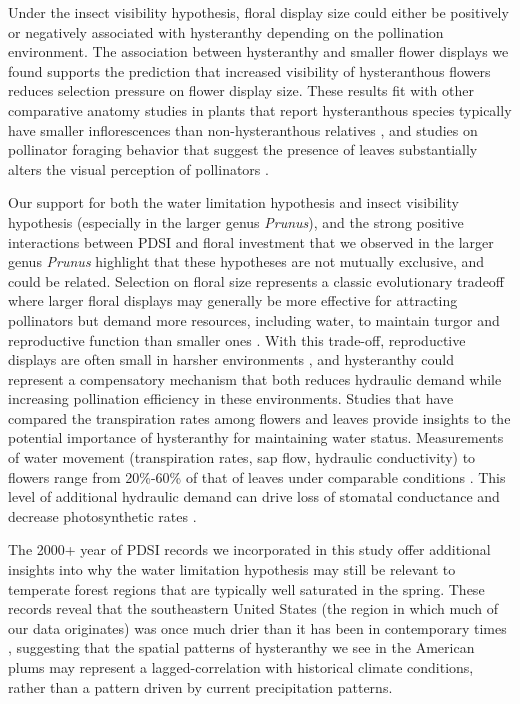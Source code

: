 \documentclass{article}[12pt]
\begin{document}
{{Under the insect visibility hypothesis, floral display size could either be positively or negatively associated with hysteranthy depending on the pollination environment. The association between hysteranthy and smaller flower displays we found supports the prediction that increased visibility of hysteranthous flowers reduces selection pressure on flower display size. These results fit with other comparative anatomy studies in plants that report hysteranthous species typically have smaller inflorescences than non-hysteranthous relatives \citep{Gunatilleke1984}, and studies on pollinator foraging behavior that suggest the presence of leaves substantially alters the visual perception of pollinators \citep{Rivest:2017aa,Forrest:2009aa}.%

Our support for both the water limitation hypothesis and insect visibility hypothesis (especially in the larger genus \emph{Prunus}), and the strong positive interactions between PDSI and floral investment that we observed in the larger genus \emph{Prunus} highlight that these hypotheses are not mutually exclusive, and could be related. Selection on floral size represents a classic evolutionary tradeoff where larger floral displays may generally be more effective for attracting pollinators but demand more resources, including water, to maintain turgor and reproductive function than smaller ones \citep{Galen:1999vr,Lambrecht:2007ur}. With this trade-off, reproductive displays are often small in harsher environments \citep{Lambrecht:2013aa,Teixido:2016aa}, and hysteranthy could represent a compensatory mechanism that both reduces hydraulic demand while increasing pollination efficiency in these environments. Studies that have compared the transpiration rates among flowers and leaves provide insights to the potential importance of hysteranthy for maintaining water status. Measurements of water movement (transpiration rates, sap flow, hydraulic conductivity) to flowers range from 20\%-60\% of that of leaves under comparable conditions \citep{Whiley:1988uf,Roddy:2012wn,Liu:2017wg,McMann:2022ww}. This level of additional hydraulic demand can drive loss of stomatal conductance and decrease photosynthetic rates \citep{Galen:1999vr}.
 
The 2000+ year of PDSI records we incorporated in this study offer additional insights into why the water limitation hypothesis may still be relevant to temperate forest regions that are typically well saturated in the spring. These records reveal that the southeastern United States (the region in which much of our data originates) was once much drier than it has been in contemporary times \citep{Cook_2010}, suggesting that the spatial patterns of hysteranthy we see in the American plums may represent a lagged-correlation with historical climate conditions, rather than a pattern driven by current precipitation patterns.

}}
\end{document}
